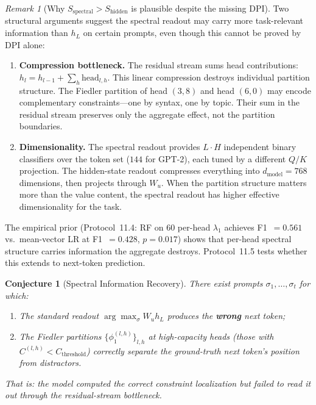 \documentclass[11pt]{article}
\newtheorem{conjecture}[definition]{Conjecture}
\theoremstyle{remark}
\newtheorem{remark}[definition]{Remark}
\begin{document}
\begin{remark}[Why $S_{\text{spectral}} > S_{\text{hidden}}$ is 
plausible despite the missing DPI]\label{rem:plausible}
Two structural arguments suggest the spectral readout may 
carry more task-relevant information than $h_L$ on certain 
prompts, even though this cannot be proved by DPI alone:
\begin{enumerate}[nosep]
  \item \textbf{Compression bottleneck.} The residual stream 
    sums head contributions: $h_l = h_{l-1} + \sum_h 
    \mathrm{head}_{l,h}$. This linear compression destroys 
    individual partition structure. The Fiedler partition of 
    head $(3,8)$ and head $(6,0)$ may encode complementary 
    constraints---one by syntax, one by topic. Their sum in 
    the residual stream preserves only the aggregate effect, 
    not the partition boundaries.
  \item \textbf{Dimensionality.} The spectral readout provides 
    $L \cdot H$ independent binary classifiers over the 
    token set ($144$ for GPT-2), each tuned by a different 
    $Q/K$ projection. The hidden-state readout compresses 
    everything into $d_{\text{model}} = 768$ dimensions, 
    then projects through $W_u$. When the partition 
    structure matters more than the value content, the 
    spectral readout has higher effective dimensionality 
    for the task.
\end{enumerate}
The empirical prior (Protocol~11.4: RF on 60 per-head 
$\lambda_1$ achieves F1~$= 0.561$ vs.\ mean-vector LR at 
F1~$= 0.428$, $p = 0.017$) shows that per-head spectral 
structure carries information the aggregate destroys. 
Protocol~11.5 tests whether this extends to next-token 
prediction.
\end{remark}

\begin{conjecture}[Spectral Information Recovery]
\label{conj:recovery}
There exist prompts $\sigma_1, \ldots, \sigma_t$ for which:
\begin{enumerate}[nosep,label=(\alph*)]
  \item The standard readout $\arg\max_\sigma W_u h_L$ 
    produces the \textbf{wrong} next token;
  \item The Fiedler partitions $\{\phi_1^{(l,h)}\}_{l,h}$ 
    at high-capacity heads (those with 
    $C^{(l,h)} < C_{\text{threshold}}$) correctly separate 
    the ground-truth next token's position from distractors.
\end{enumerate}
That is: the model \emph{computed} the correct constraint 
localization but \emph{failed to read it out} through the 
residual-stream bottleneck.
\end{conjecture}
\end{document}
